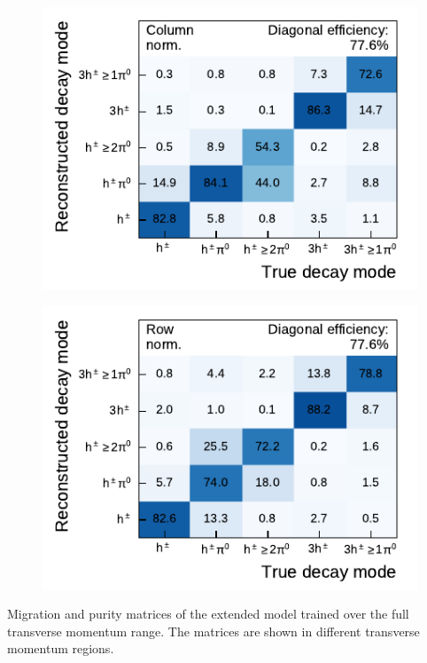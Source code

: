 \begin{minipage}{\textwidth}
\begin{subfigure}{0.48\textwidth}
  \end{subfigure}
  \begin{subfigure}{0.48\textwidth}
    \centering
    \includegraphics{./figures/decay_mode_classification/highpt/mig_mat_pt_geq_100.pdf}
  \end{subfigure}\hfill
  \begin{subfigure}{0.48\textwidth}
    \centering
    \includegraphics{./figures/decay_mode_classification/highpt/comp_mat_geq_100.pdf}
  \end{subfigure}
  \caption[Migration and purity matrices of the extended model trained over the
  full transverse momentum range]{Migration and purity matrices of the extended
    model trained over the full transverse momentum range. The matrices are
    shown in different transverse momentum regions.}
  \label{fig:highpt_matrices}
\end{minipage}

